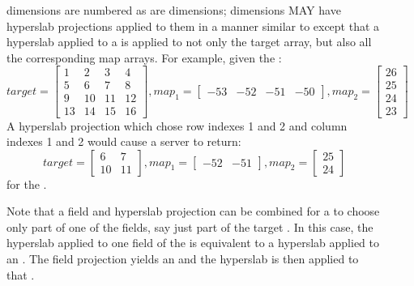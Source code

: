\documentclass[justify]{nasa-ese}
\begin{document}
\begin{description}
\item[\Grid] \Grid dimensions are numbered as are \Array dimensions; \Grid
  dimensions MAY have hyperslab projections applied to them in a manner
  similar to \Arrays except that a hyperslab applied to a \Grid is
  applied to not only the target array, but also all the corresponding map
  arrays. For example, given the \Grid:
\begin{displaymath}
  target = 
   \left[
    \begin{array}{cccc}
      1 & 2 & 3 & 4 \\
      5 & 6 & 7 & 8 \\
      9 & 10 & 11 & 12 \\
      13 & 14 & 15 & 16
    \end{array} \right],
   map_{1} = 
   \left[
    \begin{array}{cccc}
      -53 & -52 & -51 & -50
    \end{array} \right],
   map_{2} = 
   \left[
    \begin{array}{c}
      26 \\
      25 \\
      24 \\
      23 
    \end{array} \right]
\end{displaymath}
A hyperslab projection which chose row indexes 1 and 2 and column indexes 1
and 2 would cause a server to return:
\begin{displaymath}
  target = 
   \left[
    \begin{array}{cc}
      6 & 7\\
      10 & 11
    \end{array} \right],
   map_{1} = 
   \left[
    \begin{array}{cc}
      -52 & -51
    \end{array} \right],
   map_{2} = 
   \left[
    \begin{array}{c}
      25 \\
      24
    \end{array} \right]
\end{displaymath}
for the \Grid.

Note that a field and hyperslab projection can be combined for a \Grid
to choose only part of one of the fields, say just part of the target
\Array. In this case, the hyperslab applied to one field of the \Grid
is equivalent to a hyperslab applied to an \Array. The field
projection yields an \Array and the hyperslab is then applied to that
\Array.


\end{description}
\end{document}
